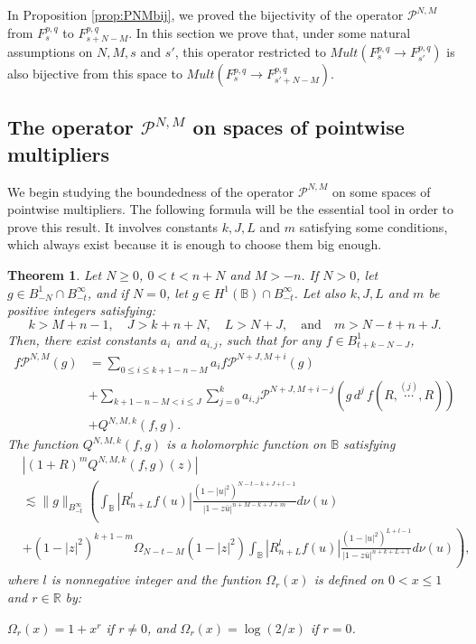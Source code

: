 \documentclass[12pt,twoside,leqno,final]{amsart}
\theoremstyle{plain}
\newtheorem{thm}{Theorem}[section]
\begin{document}
In Proposition \ref{prop:PNMbij}, we proved the bijectivity of the operator ${{\mathcal P}}^{N,M}$  from $F^{p,q}_s$ to $F^{p,q}_{s+N-M}$. 
In this section we prove that, under some natural assumptions on $N,M,s$ and $s'$,  this operator restricted to $Mult(F^{p,q}_s\to F^{p,q}_{s'})$ is also  bijective  from this space to $Mult(F^{p,q}_s\to F^{p,q}_{s'+N-M})$.

\subsection{The operator ${{\mathcal P}}^{N,M}$ on spaces of pointwise multipliers}\qquad\par

We begin studying the boundedness of the operator ${{\mathcal P}}^{N,M}$ 
on some spaces of pointwise multipliers. The following formula will be the essential tool in order to prove this result. 
It involves constants $k,J,L$ and $m$ satisfying some conditions, 
which always exist because it is enough to choose them big enough.  

\begin{thm}\label{thm:mf}
Let $N\ge 0$, $0<t<n+N$ and $M>-n$.  If $N>0$, let $g\in B^1_{-N}\cap B^\infty_{-t}$,  and if $N=0$, let $g\in H^1({{\mathbb B}})\cap B^\infty_{-t}$. 
Let also  $k,J,L$ and $m$ be positive integers satisfying: 
$$
k>M+n-1,\quad J>k+n+N,\quad  L>N+J,\quad \text{and} \quad m>N-t+n+J.
$$ 
Then,  there exist constants $a_i$ and $a_{i,j}$, 
such that  for any  $f\in B^1_{t+k-N-J}$,
\begin{equation}\label{eqn:mf}\begin{split}
f{{\mathcal P}}^{N,M}(g)&= \sum_{0\le i \le k+1-n-M} a_{i} f{{\mathcal P}}^{N+J,M+i}(g)\\
&+\sum_{k+1-n-M<i\le J}\sum_{j=0}^k a_{i,j}  {{\mathcal P}}^{N+J,M+i-j}\left(g\,d^j\,f(R,\overset{(j)}{\cdots},R)\right)\\
&+ Q^{N,M,k}(f,g).
\end{split}\end{equation}
The function $ Q^{N,M,k}(f,g) $ is a holomorphic function on ${{\mathbb B}}$  satisfying 
\begin{align*}
&|(1+R)^m  Q^{N,M,k}(f,g)(z)|\\ 
&\lesssim 
\|g\|_{B^\infty_{-t}}\left(\int_{{\mathbb B}} |R^l_{n+L} f(u)|
\frac{(1-|u|^2)^{N-t-k+J+l-1}}{|1-z\overline u|^{n+M-k+J+m}} d\nu(u)\right.\\
&\left.+(1-|z|^2)^{k+1-m}\Omega_{N-t-M}(1-|z|^2)
\int_{{\mathbb B}} |R^l_{n+L} f(u)|\frac{(1-|u|^2)^{L+l-1}}{|1-z\overline u|^{n+k+L+1}}d\nu(u)\right),
\end{align*}
where $l$ is nonnegative integer and  the funtion $\Omega_r(x)$ is defined on $0< x\le 1$ and $r\in{{\mathbb R}}$ by:

$\Omega_r(x)=1+x^{r}$ if $r\ne 0$, and $\Omega_r(x)=\log(2/x)$ if $r=0$.
\end{thm}
\end{document}
